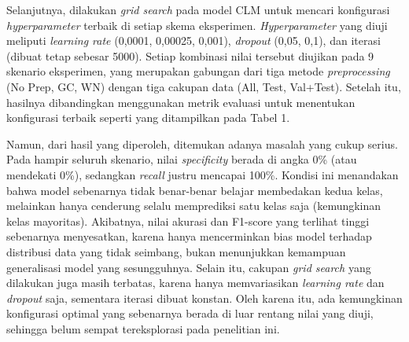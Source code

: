 Selanjutnya, dilakukan \textit{grid search} pada model CLM untuk mencari konfigurasi \textit{hyperparameter} terbaik di setiap skema eksperimen. \textit{Hyperparameter} yang diuji meliputi \textit{learning rate} (0,0001, 0,00025, 0,001), \textit{dropout} (0,05, 0,1), dan iterasi (dibuat tetap sebesar 5000). Setiap kombinasi nilai tersebut diujikan pada 9 skenario eksperimen, yang merupakan gabungan dari tiga metode \textit{preprocessing} (No Prep, GC, WN) dengan tiga cakupan data (All, Test, Val+Test). Setelah itu, hasilnya dibandingkan menggunakan metrik evaluasi untuk menentukan konfigurasi terbaik seperti yang ditampilkan pada Tabel 1.

Namun, dari hasil yang diperoleh, ditemukan adanya masalah yang cukup serius. Pada hampir seluruh skenario, nilai \textit{specificity} berada di angka 0\% (atau mendekati 0\%), sedangkan \textit{recall} justru mencapai 100\%. Kondisi ini menandakan bahwa model sebenarnya tidak benar-benar belajar membedakan kedua kelas, melainkan hanya cenderung selalu memprediksi satu kelas saja (kemungkinan kelas mayoritas). Akibatnya, nilai akurasi dan F1-score yang terlihat tinggi sebenarnya menyesatkan, karena hanya mencerminkan bias model terhadap distribusi data yang tidak seimbang, bukan menunjukkan kemampuan generalisasi model yang sesungguhnya. Selain itu, cakupan \textit{grid search} yang dilakukan juga masih terbatas, karena hanya memvariasikan \textit{learning rate} dan \textit{dropout} saja, sementara iterasi dibuat konstan. Oleh karena itu, ada kemungkinan konfigurasi optimal yang sebenarnya berada di luar rentang nilai yang diuji, sehingga belum sempat tereksplorasi pada penelitian ini.

